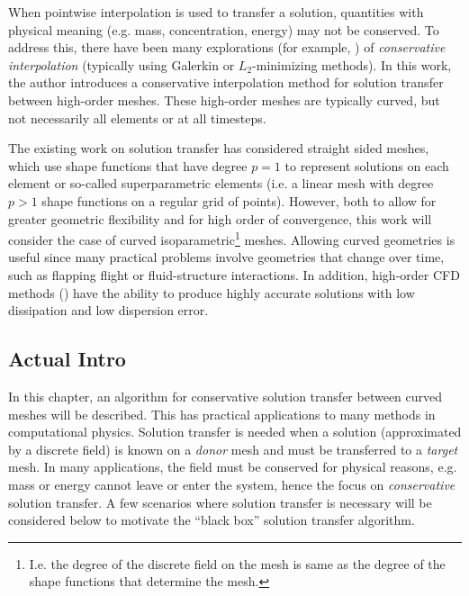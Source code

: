 \documentclass[letterpaper,10pt]{article}
\theoremstyle{definition}
\begin{document}
When pointwise interpolation is used to transfer a solution, quantities with
physical meaning (e.g. mass, concentration, energy) may not be conserved.
To address this, there have been many explorations (for example,
\cite{Jiao2004, Farrell2009, Farrell2011}) of
\emph{conservative interpolation} (typically using Galerkin or
\(L_2\)-minimizing methods). In this work, the author introduces a
conservative interpolation method for solution transfer between high-order
meshes. These high-order meshes are typically curved, but not necessarily
all elements or at all timesteps.

The existing work on solution transfer has considered straight sided meshes,
which use shape functions that have degree \(p = 1\) to represent solutions
on each element or so-called superparametric elements (i.e. a linear mesh
with degree \(p > 1\) shape functions on a regular grid of points).
However, both to allow for greater geometric flexibility
and for high order of convergence, this work will consider the case
of curved isoparametric\footnote{I.e. the degree of the discrete field on the
mesh is same as the degree of the shape functions that determine the
mesh.} meshes. Allowing curved geometries is useful since many practical
problems involve geometries that change over time, such as flapping flight
or fluid-structure interactions. In addition, high-order CFD methods
(\cite{Wang2013}) have the ability to produce highly accurate solutions
with low dissipation and low dispersion error.

\subsection{Actual Intro}

In this chapter, an algorithm for conservative solution transfer between curved
meshes will be described. This has practical applications to many methods in
computational physics. Solution transfer is needed when a solution
(approximated by a discrete field) is known on a \emph{donor} mesh and must
be transferred to a \emph{target} mesh. In many applications, the field
must be conserved for physical reasons, e.g. mass or energy cannot leave or
enter the system, hence the focus on \emph{conservative} solution transfer.
A few scenarios where solution transfer is necessary will be considered below
to motivate the ``black box'' solution transfer algorithm.
\end{document}
